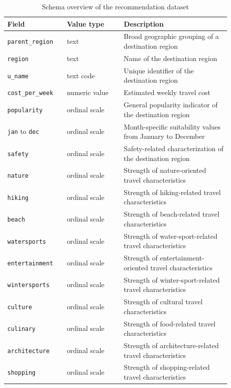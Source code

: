 \begin{table}[htbp]
\centering
\begin{tabular}{p{0.24\linewidth}p{0.23\linewidth}p{0.43\linewidth}}
\hline
Field & Value type & Description \\
\hline
\texttt{parent\_region} & text & Broad geographic grouping of a destination region \\
\texttt{region} & text & Name of the destination region \\
\texttt{u\_name} & text code & Unique identifier of the destination region \\
\texttt{cost\_per\_week} & numeric value & Estimated weekly travel cost \\
\texttt{popularity} & ordinal scale & General popularity indicator of the destination region \\
\texttt{jan} to \texttt{dec} & ordinal scale & Month-specific suitability values from January to December \\
\texttt{safety} & ordinal scale & Safety-related characterization of the destination region \\
\texttt{nature} & ordinal scale & Strength of nature-oriented travel characteristics \\
\texttt{hiking} & ordinal scale & Strength of hiking-related travel characteristics \\
\texttt{beach} & ordinal scale & Strength of beach-related travel characteristics \\
\texttt{watersports} & ordinal scale & Strength of water-sport-related travel characteristics \\
\texttt{entertainment} & ordinal scale & Strength of entertainment-oriented travel characteristics \\
\texttt{wintersports} & ordinal scale & Strength of winter-sport-related travel characteristics \\
\texttt{culture} & ordinal scale & Strength of cultural travel characteristics \\
\texttt{culinary} & ordinal scale & Strength of food-related travel characteristics \\
\texttt{architecture} & ordinal scale & Strength of architecture-related travel characteristics \\
\texttt{shopping} & ordinal scale & Strength of shopping-related travel characteristics \\
\hline
\end{tabular}
\caption{Schema overview of the recommendation dataset}
\label{table:recommendation-generation:schema-overview}
\end{table}

